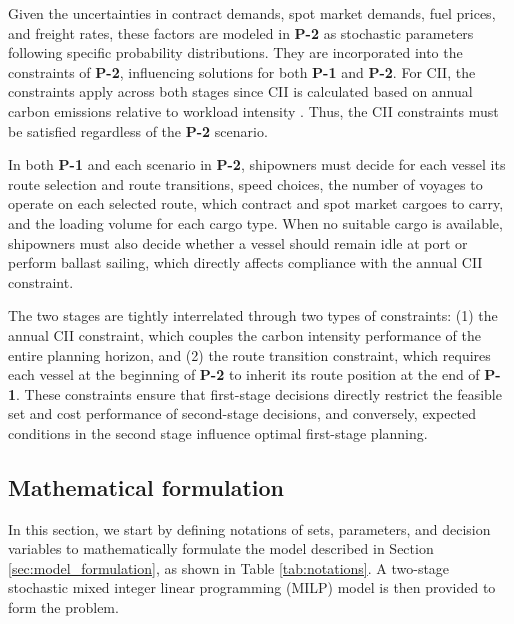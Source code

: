\documentclass[11pt,english]{article}
\begin{document}
Given the uncertainties in contract demands, spot market demands, fuel prices, and freight rates, these factors are modeled in \textbf{P-2} as stochastic parameters following specific probability distributions. They are incorporated into the constraints of \textbf{P-2}, influencing solutions for both \textbf{P-1} and \textbf{P-2}. For CII, the constraints apply across both stages since CII is calculated based on annual carbon emissions relative to workload intensity \citep{mepc2022352}. Thus, the CII constraints must be satisfied regardless of the \textbf{P-2} scenario.

In both \textbf{P-1} and each scenario in \textbf{P-2}, shipowners must decide for each vessel its route selection and route transitions, speed choices, the number of voyages to operate on each selected route, which contract and spot market cargoes to carry, and the loading volume for each cargo type. When no suitable cargo is available, shipowners must also decide whether a vessel should remain idle at port or perform ballast sailing, which directly affects compliance with the annual CII constraint.

The two stages are tightly interrelated through two types of constraints: (1) the annual CII constraint, which couples the carbon intensity performance of the entire planning horizon, and (2) the route transition constraint, which requires each vessel at the beginning of \textbf{P-2} to inherit its route position at the end of \textbf{P-1}. These constraints ensure that first-stage decisions directly restrict the feasible set and cost performance of second-stage decisions, and conversely, expected conditions in the second stage influence optimal first-stage planning.

\subsection{Mathematical formulation}
\label{sec:mathematical_formulation}

In this section, we start by defining notations of sets, parameters, and decision variables to mathematically formulate the model described in Section \ref{sec:model_formulation}, as shown in Table \ref{tab:notations}. A two-stage stochastic mixed integer linear programming (MILP) model is then provided to form the problem.
\end{document}
